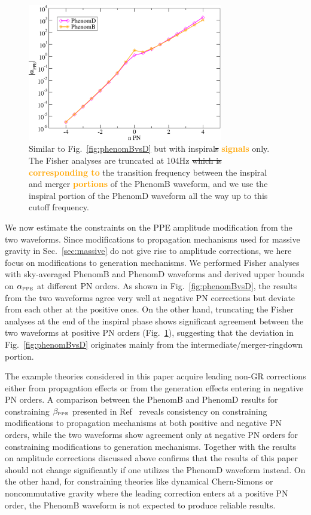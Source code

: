 \documentclass[prd,twocolumn,nofootinbib]{revtex4-1}
\newcommand{\PPE}{{\mbox{\tiny PPE}}}
\newcommand{\zack}[1]{\textcolor{orange}{\textbf{#1}} }
\begin{document}
\begin{figure}[htb]
\includegraphics[width=8.5cm]{phenomBvsphenomD-insp.pdf}
\caption{Similar to Fig.~\ref{fig:phenomBvsD} but with inspiral\sout{s} \zack{signals} only. The Fisher analyses are truncated at 104Hz \sout{which is} \zack{corresponding to} the transition frequency between the inspiral and merger \zack{portions} of the PhenomB waveform, and we use the inspiral portion of the PhenomD waveform all the way up to this cutoff frequency.}
\label{fig:phenomBvsD-insp}
\end{figure}

We now estimate the constraints on the PPE amplitude modification from the two waveforms. Since modifications to propagation mechanisms used for massive gravity in Sec.~\ref{sec:massive} do not give rise to amplitude corrections, we here focus on modifications to generation mechanisms. We performed Fisher analyses with sky-averaged PhenomB and PhenomD waveforms and derived upper bounds on $\alpha_{\PPE}$ at different PN orders. As shown in Fig.~\ref{fig:phenomBvsD}, the results from the two waveforms agree very well at negative PN corrections but deviate from each other at the positive ones. 
On the other hand, truncating the Fisher analyses at the end of the inspiral phase shows significant agreement between the two waveforms at positive PN orders (Fig.~\ref{fig:phenomBvsD-insp}), suggesting that the deviation in Fig.~\ref{fig:phenomBvsD} originates mainly from the intermediate/merger-ringdown portion.

The example theories considered in this paper acquire leading non-GR corrections either from propagation effects or from the generation effects entering in negative PN orders. A comparison between the PhenomB and PhenomD results for constraining $\beta_{\PPE}$ presented in Ref~\cite{Yunes:2016jcc} reveals consistency on constraining modifications to propagation mechanisms at both positive and negative PN orders, while the two waveforms show agreement only at negative PN orders for constraining modifications to generation mechanisms. Together with the results on amplitude corrections discussed above confirms that the results of this paper should not change significantly if one utilizes the PhenomD waveform instead. On the other hand, for constraining theories like dynamical Chern-Simons or noncommutative gravity where the leading correction enters at a positive PN order, the PhenomB waveform is not expected to produce reliable results.



\end{document}
